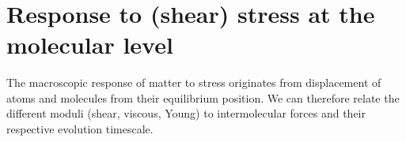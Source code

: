\documentclass[a4paper, 11pt, normalem]{report}
\begin{document}
\begin{multicols}{3}
\begin{center}
\begin{figure}[H]
 \\
        \end{figure}
    \end{center}
\end{multicols}

\section{Response to (shear) stress at the molecular level}
The macroscopic response of matter to stress originates from displacement of atoms and molecules from their equilibrium position.
We can therefore relate the different moduli (shear, viscous, Young) to intermolecular forces and their respective evolution timescale.
\end{document}
